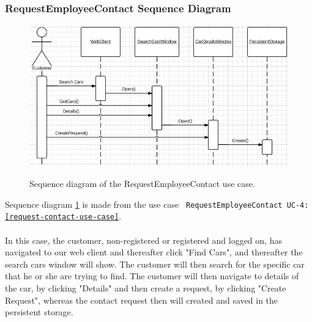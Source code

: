 \subsubsection{RequestEmployeeContact Sequence Diagram}
\begin{figure}[H]
	\centering
		\includegraphics[width=\textwidth]{Figures/SequenceDiagram-RequestEmployeeContact}\\
	\caption{Sequence diagram of the RequestEmployeeContact use case.}
  \label{fig:SequenceDiagram-RequestEmployeeContact}
\end{figure}

Sequence diagram \ref{fig:SequenceDiagram-RequestEmployeeContact} is made from the use case \texttt{ RequestEmployeeContact UC-4: \ref{request-contact-use-case}}. \\\\
In this case, the customer, non-registered or registered and logged on, has navigated to our web client and thereafter click "Find Cars", and thereafter the search cars window will show. The customer will then search for the specific car that he or she are trying to find. The customer will then navigate to details of the car, by clicking "Details" and then create a request, by clicking "Create Request", whereas the contact request then will created and saved in the persistent storage.

